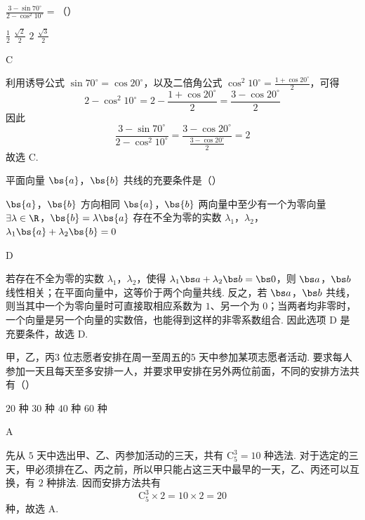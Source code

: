\begin{problem}
\(\frac{3 - \sin 70^{\circ}}{2 - \cos^{2}10^{\circ}} =\)（\quad）

\choices
    {\(\frac{1}{2}\)}
    {\(\frac{\sqrt{2}}{2}\)}
    {\(2\)}
    {\(\frac{\sqrt{3}}{2}\)}
\begin{answer}
C
\end{answer}

\begin{solution}
利用诱导公式 \(\sin70^{\circ}=\cos20^{\circ}\)，以及二倍角公式
\(\cos^2 10^{\circ}=\frac{1+\cos20^{\circ}}{2}\)，可得
\[
2-\cos^2 10^{\circ}=2-\frac{1+\cos20^{\circ}}{2}=\frac{3-\cos20^{\circ}}{2}
\]
因此
\[
\frac{3-\sin70^{\circ}}{2-\cos^2 10^{\circ}}
=\frac{3-\cos20^{\circ}}{\frac{3-\cos20^{\circ}}{2}}=2
\]
故选 C.
\end{solution}
\end{problem}

\begin{problem}
平面向量 \(\bs{a}\)，\(\bs{b}\) 共线的充要条件是（\quad）

\choices
    {\(\bs{a}\)，\(\bs{b}\) 方向相同}
    {\(\bs{a}\)，\(\bs{b}\) 两向量中至少有一个为零向量}
    {\(\exists \lambda \in \R\)，\(\bs{b} = \lambda \bs{a}\)}
    {存在不全为零的实数 \(\lambda_{1}\)，\(\lambda_{2}\)，\(\lambda_{1} \bs{a} + \lambda_{2} \bs{b} = 0\)}
\begin{answer}
D
\end{answer}

\begin{solution}
若存在不全为零的实数 \(\lambda_1\)，\(\lambda_2\)，使得
\(\lambda_1\bs a+\lambda_2\bs b=\bs0\)，则 \(\bs a\)，\(\bs b\) 线性相关；在平面向量中，这等价于两个向量共线. 反之，若 \(\bs a\)，\(\bs b\) 共线，则当其中一个为零向量时可直接取相应系数为 \(1\)、另一个为 \(0\)；当两者均非零时，一个向量是另一个向量的实数倍，也能得到这样的非零系数组合. 因此选项 D 是充要条件，故选 D.
\end{solution}
\end{problem}

\begin{problem}
甲，乙，丙\(3\text{ 位}\)志愿者安排在周一至周五的\(5\text{ 天}\)中参加某项志愿者活动. 要求每人参加一天且每天至多安排一人，并要求甲安排在另外两位前面，不同的安排方法共有（\quad）

\choices
    {\(20\text{ 种}\)}
    {\(30\text{ 种}\)}
    {\(40\text{ 种}\)}
    {\(60\text{ 种}\)}
\begin{answer}
A
\end{answer}

\begin{solution}
先从 \(5\) 天中选出甲、乙、丙参加活动的三天，共有 \(\mathrm C_5^3=10\) 种选法. 对于选定的三天，甲必须排在乙、丙之前，所以甲只能占这三天中最早的一天，乙、丙还可以互换，有 \(2\) 种排法. 因而安排方法共有
\[
\mathrm C_5^3\times2=10\times2=20
\]
种，故选 A.
\end{solution}
\end{problem}

